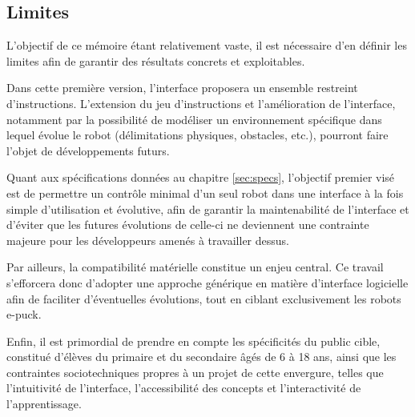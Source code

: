 \subsection{Limites} \label{sec:limites}

L’objectif de ce mémoire étant relativement vaste, il est nécessaire d’en définir les limites afin de garantir des résultats concrets et exploitables.  

Dans cette première version, l’interface proposera un ensemble restreint d’instructions.
L’extension du jeu d’instructions et l’amélioration de l’interface, notamment par la possibilité de modéliser un environnement spécifique dans lequel évolue le robot (délimitations physiques, obstacles, etc.), pourront faire l’objet de développements futurs.

Quant aux spécifications données au chapitre \ref{sec:specs}, l'objectif premier visé est de permettre un contrôle minimal d'un seul robot dans une interface à la fois simple d’utilisation et évolutive, afin de garantir la maintenabilité de l'interface et d’éviter que les futures évolutions de celle-ci ne deviennent une contrainte majeure pour les développeurs amenés à travailler dessus.

Par ailleurs, la compatibilité matérielle constitue un enjeu central.
Ce travail s’efforcera donc d’adopter une approche générique en matière d’interface logicielle afin de faciliter d’éventuelles évolutions, tout en ciblant exclusivement les robots e-puck.

Enfin, il est primordial de prendre en compte les spécificités du public cible, constitué d’élèves du primaire et du secondaire âgés de 6 à 18 ans, ainsi que les contraintes sociotechniques propres à un projet de cette envergure, telles que l’intuitivité de l’interface, l’accessibilité des concepts et l’interactivité de l’apprentissage.  
